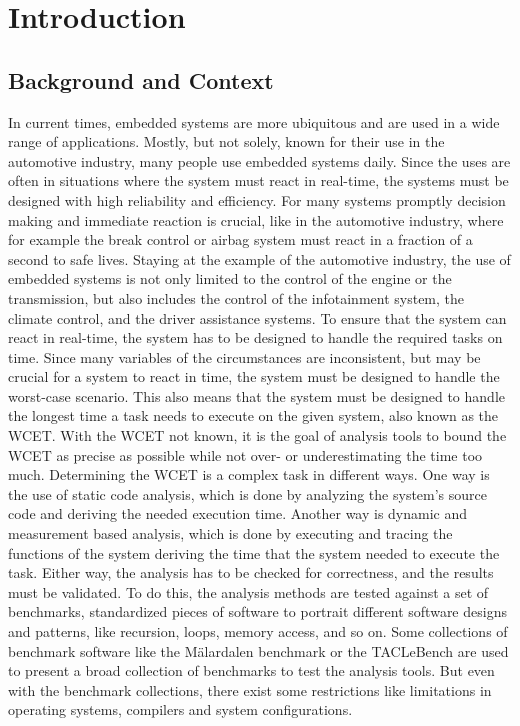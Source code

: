 \chapter{Introduction}\label{ch:introduction}
\section{Background and Context}\label{sec:background}
In current times, embedded systems are more ubiquitous and are used in a wide range of applications. 
Mostly, but not solely, known for their use in the automotive industry, many people use embedded systems daily.
Since the uses are often in situations where the system must react in real-time, the systems must be designed with high reliability and efficiency.
For many systems promptly decision making and immediate reaction is crucial, like in the automotive industry, where for example the break control or airbag system must react in a fraction of a second to safe lives. 
Staying at the example of the automotive industry, the use of embedded systems is not only limited to the control of the engine or the transmission, but also includes the control of the infotainment system, the climate control, and the driver assistance systems.
To ensure that the system can react in real-time, the system has to be designed to handle the required tasks on time.
Since many variables of the circumstances are inconsistent, but may be crucial for a system to react in time, the system must be designed to handle the worst-case scenario.
This also means that the system must be designed to handle the longest time a task needs to execute on the given system, also known as the \ac{WCET}.
With the \ac{WCET} not known, it is the goal of analysis tools to bound the \ac{WCET} as precise as possible while not over- or underestimating the time too much.
Determining the \ac{WCET} is a complex task in different ways.
One way is the use of static code analysis, which is done by analyzing the system's source code and deriving the needed execution time\cite{buttazzoHardRealTimeComputing2024}.
Another way is dynamic and measurement based analysis, which is done by executing and tracing the functions of the system deriving the time that the system needed to execute the task\cite{buttazzoHardRealTimeComputing2024}.
Either way, the analysis has to be checked for correctness, and the results must be validated.
To do this, the analysis methods are tested against a set of benchmarks, standardized pieces of software to portrait different software designs and patterns, like recursion, loops, memory access, and so on.
Some collections of benchmark software like the Mälardalen benchmark\cite{gustafssonMalardalenWCETBenchmarks2012} or the TACLeBench\cite{falkTACLeBenchBenchmarkCollection2016} are used to present a broad collection of benchmarks to test the analysis tools.
But even with the benchmark collections, there exist some restrictions like limitations in operating systems, compilers and system configurations.\cite{falkTACLeBenchBenchmarkCollection2016,gustafssonMalardalenWCETBenchmarks2012}

